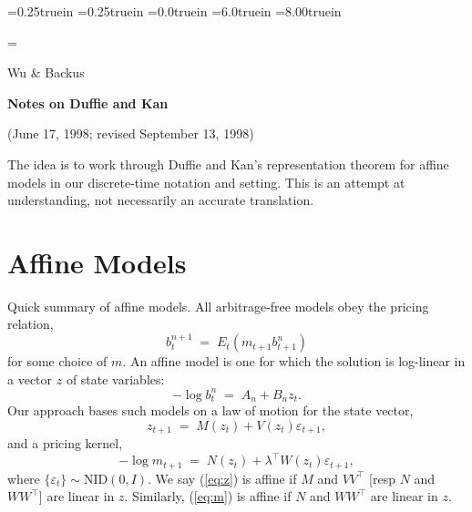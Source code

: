 
\oddsidemargin=0.25truein
\evensidemargin=0.25truein
\topmargin=0.0truein
\textwidth=6.0truein
\textheight=8.00truein

\newcommand{\var}{\mbox{\em Var\/}}
\newcommand{\cov}{\mbox{\em Cov\/}}
\newcommand{\corr}{\mbox{\em Corr\/}}
\newcommand{\nid}{\mbox{NID}}
\newcommand{\ds}{\displaystyle}

\newcommand{\paperstart}[0]{\par\penalty 1 \hangindent=32pt \hangafter=1}
\newcommand{\paperend}[0]{\penalty -1 \par\vskip 10pt plus 10pt minus 10pt}
\newcommand{\paper}[1]{\paperstart #1 \paperend}


\parskip=\bigskipamount
\parindent=0.0in
\thispagestyle{empty}
\begin{flushright} Wu \& Backus \end{flushright}

\bigskip
\centerline{\Large \bf Notes on Duffie and Kan}
\centerline{(June 17, 1998; revised September 13, 1998)}

\bigskip
The idea is to work through Duffie and Kan's representation
theorem for affine models in our discrete-time notation and setting.
This is an attempt at understanding, not necessarily
an accurate translation.

\section*{Affine Models}

Quick summary of affine models.
All arbitrage-free models obey the pricing relation,
\begin{equation}
        b^{n+1}_t \;=\; E_t \left( m_{t+1} b^n_{t+1} \right)
        \label{eq:foc}
\end{equation}
for some choice of $m$.
An affine model is one for which the solution is log-linear in
a vector $z$ of state variables:
\begin{equation}
        - \log b^{n}_t \;=\; A_n + B_n z_t .
        \label{eq:loglin}
\end{equation}
Our approach bases such models on a law of motion for the state vector,
\begin{equation}
        z_{t+1} \;=\; M(z_t) + V(z_t) \varepsilon_{t+1} ,
        \label{eq:z}
\end{equation}
and a pricing kernel,
\begin{equation}
        - \log m_{t+1} \;=\; N(z_t) + \lambda^\top W(z_t) \varepsilon_{t+1} ,
        \label{eq:m}
\end{equation}
where $\{ \varepsilon_t \} \sim \mbox{NID}(0,I)$.
We say (\ref{eq:z})
is affine if $M$ and $VV^\top$
[resp $N$ and $WW^\top$]
are linear in $z$.
Similarly, (\ref{eq:m}) is affine if
$N$ and $WW^\top$ are linear in $z$.



